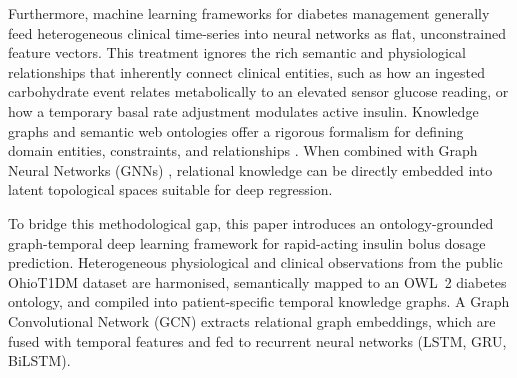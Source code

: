 \documentclass[10pt,a4paper]{article}
\begin{document}
Furthermore, machine learning frameworks for diabetes management generally feed heterogeneous clinical time-series into neural networks as flat, unconstrained feature vectors. This treatment ignores the rich semantic and physiological relationships that inherently connect clinical entities, such as how an ingested carbohydrate event relates metabolically to an elevated sensor glucose reading, or how a temporary basal rate adjustment modulates active insulin. Knowledge graphs and semantic web ontologies offer a rigorous formalism for defining domain entities, constraints, and relationships \cite{hogan2021}. When combined with Graph Neural Networks (GNNs) \cite{kipf2017, wu2021}, relational knowledge can be directly embedded into latent topological spaces suitable for deep regression.

To bridge this methodological gap, this paper introduces an ontology-grounded graph-temporal deep learning framework for rapid-acting insulin bolus dosage prediction. Heterogeneous physiological and clinical observations from the public OhioT1DM dataset \cite{marling2018, marling2020} are harmonised, semantically mapped to an OWL~2 diabetes ontology, and compiled into patient-specific temporal knowledge graphs. A Graph Convolutional Network (GCN) extracts relational graph embeddings, which are fused with temporal features and fed to recurrent neural networks (LSTM, GRU, BiLSTM).
\end{document}
